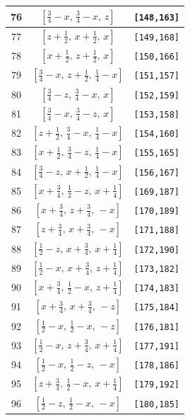 \documentclass[fleqn,8pt]{jsarticle}
\begin{document}
\begin{longtable}{ccc}
76 & $\left[ \frac{3}{4} - x,\, \frac{3}{4} - x,\, z \right]$ & {\tt [148,163]} \\ \hline
77 & $\left[ z + \frac{1}{2},\, x + \frac{1}{2},\, x \right]$ & {\tt [149,168]} \\ \hline
78 & $\left[ x + \frac{1}{2},\, z + \frac{1}{2},\, x \right]$ & {\tt [150,166]} \\ \hline
79 & $\left[ \frac{3}{4} - x,\, z + \frac{1}{2},\, \frac{1}{4} - x \right]$ & {\tt [151,157]} \\ \hline
80 & $\left[ \frac{3}{4} - z,\, \frac{3}{4} - x,\, x \right]$ & {\tt [152,159]} \\ \hline
81 & $\left[ \frac{3}{4} - x,\, \frac{3}{4} - z,\, x \right]$ & {\tt [153,158]} \\ \hline
82 & $\left[ z + \frac{1}{2},\, \frac{3}{4} - x,\, \frac{1}{4} - x \right]$ & {\tt [154,160]} \\ \hline
83 & $\left[ x + \frac{1}{2},\, \frac{3}{4} - z,\, \frac{1}{4} - x \right]$ & {\tt [155,165]} \\ \hline
84 & $\left[ \frac{3}{4} - z,\, x + \frac{1}{2},\, \frac{1}{4} - x \right]$ & {\tt [156,167]} \\ \hline
85 & $\left[ x + \frac{3}{4},\, \frac{1}{2} - z,\, x + \frac{1}{4} \right]$ & {\tt [169,187]} \\ \hline
86 & $\left[ x + \frac{3}{4},\, z + \frac{3}{4},\, - x \right]$ & {\tt [170,189]} \\ \hline
87 & $\left[ z + \frac{3}{4},\, x + \frac{3}{4},\, - x \right]$ & {\tt [171,188]} \\ \hline
88 & $\left[ \frac{1}{2} - z,\, x + \frac{3}{4},\, x + \frac{1}{4} \right]$ & {\tt [172,190]} \\ \hline
89 & $\left[ \frac{1}{2} - x,\, x + \frac{3}{4},\, z + \frac{1}{4} \right]$ & {\tt [173,182]} \\ \hline
90 & $\left[ x + \frac{3}{4},\, \frac{1}{2} - x,\, z + \frac{1}{4} \right]$ & {\tt [174,183]} \\ \hline
91 & $\left[ x + \frac{3}{4},\, x + \frac{3}{4},\, - z \right]$ & {\tt [175,184]} \\ \hline
92 & $\left[ \frac{1}{2} - x,\, \frac{1}{2} - x,\, - z \right]$ & {\tt [176,181]} \\ \hline
93 & $\left[ \frac{1}{2} - x,\, z + \frac{3}{4},\, x + \frac{1}{4} \right]$ & {\tt [177,191]} \\ \hline
94 & $\left[ \frac{1}{2} - x,\, \frac{1}{2} - z,\, - x \right]$ & {\tt [178,186]} \\ \hline
95 & $\left[ z + \frac{3}{4},\, \frac{1}{2} - x,\, x + \frac{1}{4} \right]$ & {\tt [179,192]} \\ \hline
96 & $\left[ \frac{1}{2} - z,\, \frac{1}{2} - x,\, - x \right]$ & {\tt [180,185]} \\
\end{longtable}
\end{document}
